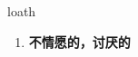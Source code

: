 
\begin{frame}
{\huge loath}
\begin{center}
\begin{enumerate}\Large
  \item \textbf{不情愿的，讨厌的}
\end{enumerate}
\end{center}
\end{frame}
